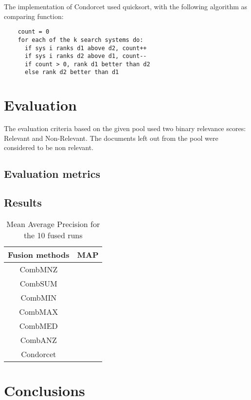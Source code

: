     The implementation of Condorcet used quicksort, with the following algorithm
	as comparing function:

	\begin{lstlisting}
	count = 0
	for each of the k search systems do:
	  if sys i ranks d1 above d2, count++
	  if sys i ranks d2 above d1, count--
	  if count > 0, rank d1 better than d2
	  else rank d2 better than d1
	\end{lstlisting}

    \section{Evaluation}

	The evaluation criteria based on the given pool used two binary relevance scores:
	Relevant and Non-Relevant.
	The documents left out from the pool were considered to be non relevant.

        \subsection{Evaluation metrics}

	    \subsection{Results}

		\begin{table}[H]
		    \centering
		    \begin{tabular}{c p{4cm}}
		    \toprule
		    \textbf{Fusion methods} & \textbf{MAP} \\ \toprule
		    CombMNZ &  \\ \hline
		    CombSUM &  \\ \hline
		    CombMIN &  \\ \hline
		    CombMAX &  \\ \hline
		    CombMED &  \\ \hline
		    CombANZ &  \\ \hline
			Condorcet &  \\ \bottomrule
		    \end{tabular}
		    \caption{Mean Average Precision for the 10 fused runs}
		\end{table}

	\section{Conclusions}
	


